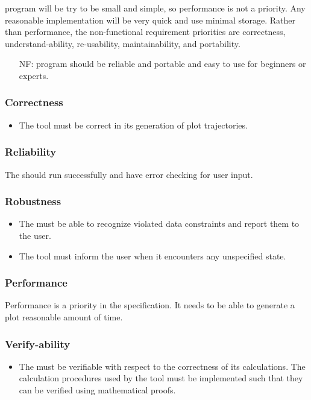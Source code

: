 \documentclass[12pt, titlepage]{article}
\newcounter{reqnum} %
\newcounter{nfreqnum} %
\begin{document}
\progname program will be try to be small and simple, so performance is not a 
priority. Any reasonable implementation will be very quick and use minimal 
storage. Rather than performance, the non-functional requirement priorities 
are correctness, understand-ability, re-usability, maintainability, and 
portability. 

\begin{itemize}
\item[NF\refstepcounter{nfreqnum}\thenfreqnum:] \progname program should be 
reliable and portable and easy to use for beginners or experts.
\end{itemize}

\subsubsection*{Correctness}
\begin{itemize}
\item The \progname tool must be correct in its generation 
of plot trajectories.
\end{itemize}

\subsubsection*{Reliability}

The \progname should run successfully and have error checking for user input.

\subsubsection*{Robustness}
\begin{itemize}
	\item The \progname must be able to recognize violated data 
	constraints and report them to the user.
	\item The \progname tool must inform the user when it encounters any 
	unspecified state.
\end{itemize}

\subsubsection*{Performance}
Performance is a priority in the \progname specification. 
It needs to be able to generate a plot reasonable amount of time.

\subsubsection*{Verify-ability}
\begin{itemize}
	\item The \progname must be verifiable with respect to the 
	correctness of its calculations. The calculation 
	procedures used by the \progname tool must be implemented such that 
	they can be verified using mathematical proofs.
\end{itemize}
\end{document}

